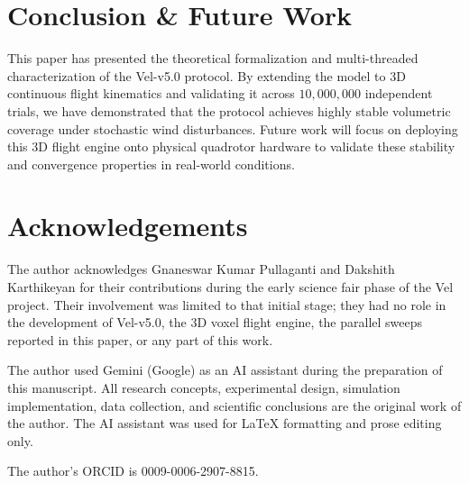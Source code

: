 \documentclass[letterpaper, 10pt, conference]{IEEEtran}
\begin{document}
\section{Conclusion \& Future Work}
\label{sec:conclusion}

This paper has presented the theoretical formalization and multi-threaded characterization of the Vel-v5.0 protocol. By extending the model to 3D continuous flight kinematics and validating it across $10{,}000{,}000$ independent trials, we have demonstrated that the protocol achieves highly stable volumetric coverage under stochastic wind disturbances. Future work will focus on deploying this 3D flight engine onto physical quadrotor hardware to validate these stability and convergence properties in real-world conditions.

\section*{Acknowledgements}
The author acknowledges Gnaneswar Kumar Pullaganti and Dakshith Karthikeyan for their contributions during the early science fair phase of the Vel project. Their involvement was limited to that initial stage; they had no role in the development of Vel-v5.0, the 3D voxel flight engine, the parallel sweeps reported in this paper, or any part of this work.

The author used Gemini (Google) as an AI assistant during the preparation of this manuscript. All research concepts, experimental design, simulation implementation, data collection, and scientific conclusions are the original work of the author. The AI assistant was used for LaTeX formatting and prose editing only.

The author's ORCID is 0009-0006-2907-8815.
\end{document}
